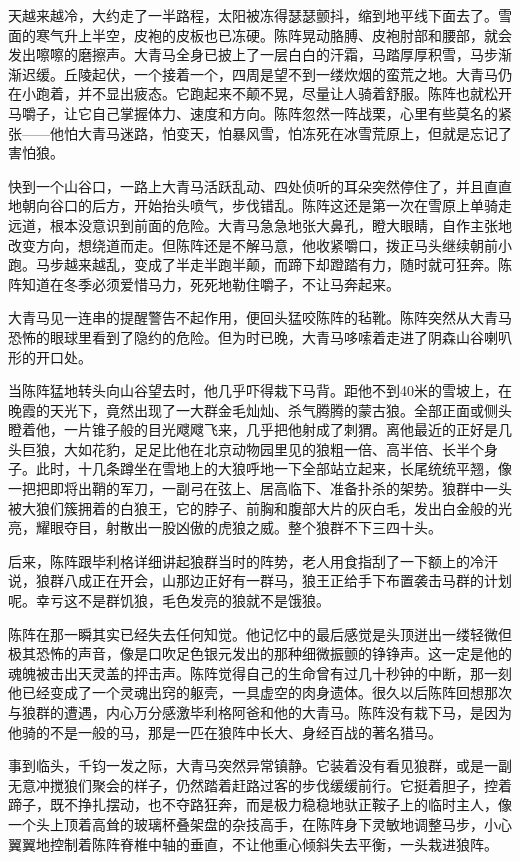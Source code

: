 \par 天越来越冷，大约走了一半路程，太阳被冻得瑟瑟颤抖，缩到地平线下面去了。雪面的寒气升上半空，皮袍的皮板也已冻硬。陈阵晃动胳膊、皮袍肘部和腰部，就会发出嚓嚓的磨擦声。大青马全身已披上了一层白白的汗霜，马踏厚厚积雪，马步渐渐迟缓。丘陵起伏，一个接着一个，四周是望不到一缕炊烟的蛮荒之地。大青马仍在小跑着，并不显出疲态。它跑起来不颠不晃，尽量让人骑着舒服。陈阵也就松开马嚼子，让它自己掌握体力、速度和方向。陈阵忽然一阵战栗，心里有些莫名的紧张——他怕大青马迷路，怕变天，怕暴风雪，怕冻死在冰雪荒原上，但就是忘记了害怕狼。
\par 快到一个山谷口，一路上大青马活跃乱动、四处侦听的耳朵突然停住了，并且直直地朝向谷口的后方，开始抬头喷气，步伐错乱。陈阵这还是第一次在雪原上单骑走远道，根本没意识到前面的危险。大青马急急地张大鼻孔，瞪大眼睛，自作主张地改变方向，想绕道而走。但陈阵还是不解马意，他收紧嚼口，拨正马头继续朝前小跑。马步越来越乱，变成了半走半跑半颠，而蹄下却蹬踏有力，随时就可狂奔。陈阵知道在冬季必须爱惜马力，死死地勒住嚼子，不让马奔起来。
\par 大青马见一连串的提醒警告不起作用，便回头猛咬陈阵的毡靴。陈阵突然从大青马恐怖的眼球里看到了隐约的危险。但为时已晚，大青马哆嗦着走进了阴森山谷喇叭形的开口处。
\par 当陈阵猛地转头向山谷望去时，他几乎吓得栽下马背。距他不到40米的雪坡上，在晚霞的天光下，竟然出现了一大群金毛灿灿、杀气腾腾的蒙古狼。全部正面或侧头瞪着他，一片锥子般的目光飕飕飞来，几乎把他射成了刺猬。离他最近的正好是几头巨狼，大如花豹，足足比他在北京动物园里见的狼粗一倍、高半倍、长半个身子。此时，十几条蹲坐在雪地上的大狼呼地一下全部站立起来，长尾统统平翘，像一把把即将出鞘的军刀，一副弓在弦上、居高临下、准备扑杀的架势。狼群中一头被大狼们簇拥着的白狼王，它的脖子、前胸和腹部大片的灰白毛，发出白金般的光亮，耀眼夺目，射散出一股凶傲的虎狼之威。整个狼群不下三四十头。
\par 后来，陈阵跟毕利格详细讲起狼群当时的阵势，老人用食指刮了一下额上的冷汗说，狼群八成正在开会，山那边正好有一群马，狼王正给手下布置袭击马群的计划呢。幸亏这不是群饥狼，毛色发亮的狼就不是饿狼。
\par 陈阵在那一瞬其实已经失去任何知觉。他记忆中的最后感觉是头顶迸出一缕轻微但极其恐怖的声音，像是口吹足色银元发出的那种细微振颤的铮铮声。这一定是他的魂魄被击出天灵盖的抨击声。陈阵觉得自己的生命曾有过几十秒钟的中断，那一刻他已经变成了一个灵魂出窍的躯壳，一具虚空的肉身遗体。很久以后陈阵回想那次与狼群的遭遇，内心万分感激毕利格阿爸和他的大青马。陈阵没有栽下马，是因为他骑的不是一般的马，那是一匹在狼阵中长大、身经百战的著名猎马。
\par 事到临头，千钧一发之际，大青马突然异常镇静。它装着没有看见狼群，或是一副无意冲搅狼们聚会的样子，仍然踏着赶路过客的步伐缓缓前行。它挺着胆子，控着蹄子，既不挣扎摆动，也不夺路狂奔，而是极力稳稳地驮正鞍子上的临时主人，像一个头上顶着高耸的玻璃杯叠架盘的杂技高手，在陈阵身下灵敏地调整马步，小心翼翼地控制着陈阵脊椎中轴的垂直，不让他重心倾斜失去平衡，一头栽进狼阵。
